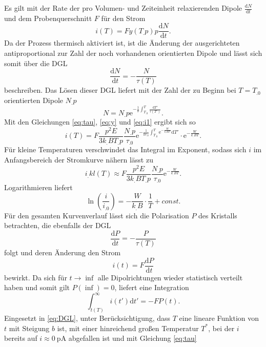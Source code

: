 Es gilt mit der Rate der pro Volumen- und Zeiteinheit relaxierenden Dipole $\frac{\mathrm{d}N}{\mathrm{d}t}$ und dem Probenquerschnitt $F$ für den Strom
\begin{equation}
i(T)=F y(T_.p)p\frac{\mathrm{d}N}{\mathrm{d}t}\text{.}\label{eq:i1}
\end{equation}
Da der Prozess thermisch aktiviert ist, ist die Änderung der ausgerichteten antiproportional zur Zahl der noch vorhandenen orientierten Dipole und lässt sich somit über die DGL
\[
\frac{\mathrm{d}N}{\mathrm{d}t}=-\frac{N}{\tau(T)}
\]
beschreiben.
Das Lösen dieser DGL liefert mit der Zahl der zu Beginn bei $T=T_.0$ orientierten Dipole $N_.p$
\begin{equation}
N=N_.p\mathrm{e}^{-\frac{1}{b}\int_{T_.0}^T\frac{\mathrm{d}T'}{\tau(T')}}\text{.}\label{eq:N}
\end{equation}
Mit den Gleichungen \eqref{eq:tau}, \eqref{eq:y} und \eqref{eq:i1} ergibt sich so
\begin{equation}
i(T)=F\frac{p^2E}{3k_.BT_.p}\frac{N_.p}{\tau_.0}\mathrm{e}^{-\frac{1}{b\tau_.0}\int_{T_.0}^T\mathrm{e}^{-\frac{W}{k_.BT'}}\mathrm{d}T'}\cdot \mathrm{e}^{-\frac{W}{k_.BT}}\text{.}\label{eq:i2}
\end{equation}
Für kleine Temperaturen verschwindet das Integral im Exponent, sodass sich $i$ im Anfangsbereich der Stromkurve nähern lässt zu
\begin{equation}
i_.{kl}(T)\approx F\frac{p^2E}{3k_.BT_.p}\frac{N_.p}{\tau_.0}\mathrm{e}^{-\frac{W}{k_.BT}}\text{.}\label{eq:i_kl}
\end{equation}
Logarithmieren liefert 
\begin{equation}
\ln\left(\frac{i}{i_.0}\right)=-\frac{W}{k_.B}\cdot\frac{1}{T}+const\text{.}\label{eq:ln1}
\end{equation}
Für den gesamten Kurvenverlauf lässt sich die Polarisation $P$ des Kristalls betrachten, die ebenfalls der DGL
\begin{equation}
\frac{\mathrm{d}P}{\mathrm{d}t}=-\frac{P}{\tau(T)}\label{eq:DGL}
\end{equation}
folgt und deren Änderung den Strom
\[
i(t)=F\frac{\mathrm{d}P}{\mathrm{d}t}
\]
bewirkt. Da sich für $t\rightarrow\inf$ alle Dipolrichtungen wieder statistisch verteilt haben und somit gilt $P(\inf)=0$, liefert eine Integration
\[
\int_{t(T)}^{\infty}i(t')\mathrm{d}t'=-F P(t)\text{.}
\]
Eingesetzt in \eqref{eq:DGL}, unter Berücksichtigung, dass $T$ eine lineare Funktion von $t$ mit Steigung $b$ ist, mit einer hinreichend großen Temperatur $T^*$, bei der $i$ bereits auf $i\approx\SI{0}{\pico\ampere}$ abgefallen ist und mit Gleichung \eqref{eq:tau}
